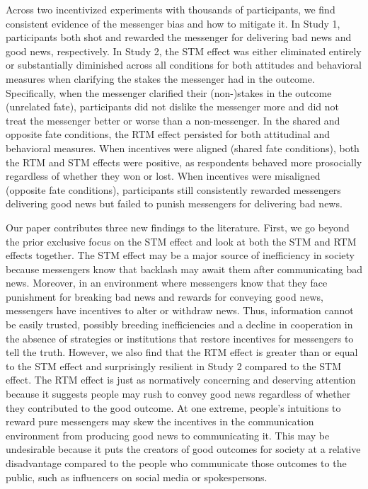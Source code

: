 Across two incentivized experiments with thousands of participants, we
find consistent evidence of the messenger bias and how to mitigate it.
In Study 1, participants both shot and rewarded the messenger for
delivering bad news and good news, respectively. In Study 2, the
STM effect was either eliminated entirely or substantially diminished
across all conditions for both attitudes and behavioral measures when
clarifying the stakes the messenger had in the outcome. Specifically,
when the messenger clarified their (non-)stakes in the outcome
(unrelated fate), participants did not dislike the messenger more and
did not treat the messenger better or worse than a non-messenger. In the
shared and opposite fate conditions, the RTM effect persisted for both
attitudinal and behavioral measures. When incentives were aligned
(shared fate conditions), both the RTM and STM effects were positive, as
respondents behaved more prosocially regardless of whether they won or
lost. When incentives were misaligned (opposite fate conditions),
participants still consistently rewarded messengers delivering good
news but failed to punish messengers for delivering bad news.

Our paper contributes three new findings to the literature. First, we go
beyond the prior exclusive focus on the STM effect and look at both the
STM and RTM effects together. The STM effect may be a major source of
inefficiency in society because messengers know that backlash may await
them after communicating bad news. Moreover, in an environment where
messengers know that they face punishment for breaking bad news and
rewards for conveying good news, messengers have incentives to alter or
withdraw news. Thus, information cannot be easily trusted, possibly
breeding inefficiencies and a decline in cooperation in the absence of
strategies or institutions that restore incentives for messengers to
tell the truth. However, we also find that the RTM effect is greater
than or equal to the STM effect and surprisingly resilient in Study 2
compared to the STM effect. The RTM effect is just as normatively concerning
and deserving attention because it suggests people may rush to convey
good news regardless of whether they contributed to the good outcome. At
one extreme, people's intuitions to reward pure messengers may skew the
incentives in the communication environment from producing good news to
communicating it. This may be undesirable because it puts the creators
of good outcomes for society at a relative disadvantage compared to the
people who communicate those outcomes to the public, such as influencers
on social media or spokespersons.

